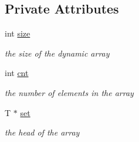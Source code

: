 \subsection*{Private Attributes}
\begin{DoxyCompactItemize}
\item 
\hypertarget{classparray_1_1PointerArray_a3152cfa7b5f1249c42fd8b9d9a17c380}{int \hyperlink{classparray_1_1PointerArray_a3152cfa7b5f1249c42fd8b9d9a17c380}{size}}\label{classparray_1_1PointerArray_a3152cfa7b5f1249c42fd8b9d9a17c380}

\begin{DoxyCompactList}\small\item\em the size of the dynamic array \end{DoxyCompactList}\item 
\hypertarget{classparray_1_1PointerArray_aaf856470924385ecbab1c075552e81a8}{int \hyperlink{classparray_1_1PointerArray_aaf856470924385ecbab1c075552e81a8}{cnt}}\label{classparray_1_1PointerArray_aaf856470924385ecbab1c075552e81a8}

\begin{DoxyCompactList}\small\item\em the number of elements in the array \end{DoxyCompactList}\item 
\hypertarget{classparray_1_1PointerArray_a058d80ea7a679e6299126eaa2f7b3f82}{T $\ast$ \hyperlink{classparray_1_1PointerArray_a058d80ea7a679e6299126eaa2f7b3f82}{set}}\label{classparray_1_1PointerArray_a058d80ea7a679e6299126eaa2f7b3f82}

\begin{DoxyCompactList}\small\item\em the head of the array \end{DoxyCompactList}\end{DoxyCompactItemize}
